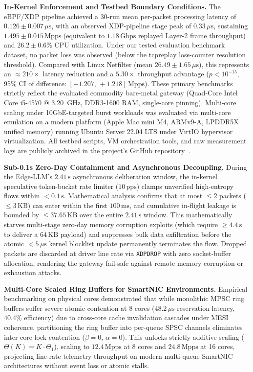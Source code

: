 \documentclass[journal]{IEEEtran}
\renewcommand{\_}{\textunderscore\allowbreak}
\begin{document}
\textbf{In-Kernel Enforcement and Testbed Boundary Conditions.}
The eBPF/XDP pipeline achieved a 30-run mean per-packet processing latency of
$0.126 \pm 0.007\,\mu\text{s}$, with an observed XDP-pipeline stage peak of
$0.33\,\mu\text{s}$, sustaining $1.495 \pm 0.015\,\text{Mpps}$ (equivalent to
$1.18\,\text{Gbps}$ replayed Layer-2 frame throughput) and $26.2 \pm 0.6\%$ CPU utilization.
Under our tested evaluation benchmark dataset, no packet loss was observed (below the
tcpreplay loss-counter resolution threshold). Compared with Linux Netfilter
(mean $26.49 \pm 1.65\,\mu\text{s}$), this represents an $\approx\!210\times$ latency reduction
and a $5.30\times$ throughput advantage ($p < 10^{-15}$, 95\% CI of difference:
$[+1.207,\, +1.218]\,\text{Mpps}$). These primary benchmarks strictly reflect the evaluated
commodity bare-metal gateway (Quad-Core Intel Core i5-4570 @ 3.20~GHz, DDR3-1600 RAM,
single-core pinning). Multi-core scaling under 10GbE-targeted burst workloads was evaluated
via multi-core emulation on a modern platform (Apple Mac mini M4, ARMv9-A, LPDDR5X unified memory)
running Ubuntu Server 22.04 LTS under VirtIO hypervisor virtualization. All testbed scripts,
VM orchestration tools, and raw measurement logs are publicly archived in the project's
GitHub repository~\cite{asmshadhinai2026code}.

\textbf{Sub-0.1s Zero-Day Containment and Asynchronous Decoupling.}
During the Edge-LLM's $2.41\,\text{s}$ asynchronous deliberation window, the in-kernel speculative
token-bucket rate limiter ($10\,\text{pps}$) clamps unverified high-entropy flows within $< 0.1\,\text{s}$.
Mathematical analysis confirms that at most $\le 2$ packets ($\le 3\,\text{KB}$) can enter within
the first $100\,\text{ms}$, and cumulative in-flight leakage is bounded by $\le 37.65\,\text{KB}$ over
the entire $2.41\,\text{s}$ window. This mathematically starves multi-stage zero-day memory corruption
exploits (which require $\ge 4.4\,\text{s}$ to deliver a $64\,\text{KB}$ payload) and suppresses bulk
data exfiltration before the atomic $< 5\,\mu\text{s}$ kernel blocklist update permanently terminates the flow.
Dropped packets are discarded at driver line rate via \texttt{XDP\_DROP} with zero socket-buffer allocation,
rendering the gateway fail-safe against remote memory corruption or exhaustion attacks.

\textbf{Multi-Core Scaled Ring Buffers for SmartNIC Environments.}
Empirical benchmarking on physical cores demonstrated that while monolithic MPSC ring buffers suffer
severe atomic contention at 8 cores ($48.2\,\mu\text{s}$ reservation latency, $40.4\%$ efficiency) due
to cross-core cache invalidation cascades under MESI coherence, partitioning the ring buffer into
per-queue SPSC channels eliminates inter-core lock contention ($\beta = 0$, $\alpha = 0$). This unlocks
strictly additive scaling ($\Theta(K) = K \cdot \Theta_1$), scaling to $12.4\,\text{Mpps}$ at 8 cores
and $24.8\,\text{Mpps}$ at 16 cores, projecting line-rate telemetry throughput on modern multi-queue
SmartNIC architectures without event loss or atomic stalls.
\end{document}
